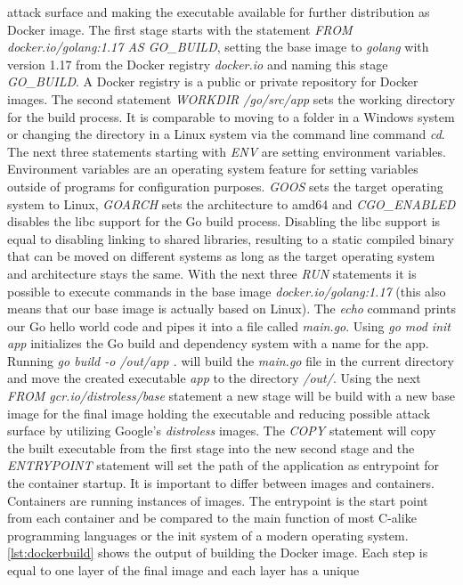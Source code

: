 \documentclass[titlepage]{report}
\begin{document}
attack surface and making the executable available for further distribution as Docker image. The first stage starts with the statement
\emph{FROM docker.io/golang:1.17 AS GO\_BUILD}, setting the base image to \emph{golang} with version 1.17 from the Docker registry \emph{docker.io}
and naming this stage \emph{GO\_BUILD}. A Docker registry is a public or private repository for Docker images. 
The second statement \emph{WORKDIR /go/src/app} sets the working directory for the build process. It is comparable to moving to a folder
in a Windows system or changing the directory in a Linux system via the command line command \emph{cd}. The next three statements starting
with \emph{ENV} are setting environment variables. Environment variables are an operating system feature for setting variables outside
of programs for configuration purposes. \emph{GOOS} sets the target operating system to Linux, \emph{GOARCH} sets the architecture to amd64
and \emph{CGO\_ENABLED} disables the libc support for the Go build process. Disabling the libc support is equal to disabling linking
to shared libraries, resulting to a static compiled binary that can be moved on different systems as long as the target operating system
and architecture stays the same. With the next three \emph{RUN} statements it is possible to execute commands in the base image
\emph{docker.io/golang:1.17} (this also means that our base image is actually based on Linux). The \emph{echo} command
prints our Go hello world code and pipes it into a file called \emph{main.go}. Using \emph{go mod init app} initializes
the Go build and dependency system with a name for the app. Running \emph{go build -o /out/app .} will build the \emph{main.go}
file in the current directory and move the created executable \emph{app} to the directory \emph{/out/}. Using the next
\emph{FROM gcr.io/distroless/base} statement a new stage will be build with a new base image for the final image holding the executable
and reducing possible attack surface by utilizing Google's \emph{distroless} images. The \emph{COPY} statement will
copy the built executable from the first stage into the new second stage and the \emph{ENTRYPOINT} statement will set
the path of the application as entrypoint for the container startup. It is important to differ between images and containers.
Containers are running instances of images. The entrypoint is the start point from each container and be compared to the main function
of most C-alike programming languages or the init system of a modern operating system. \autoref{lst:dockerbuild} shows
the output of building the Docker image. Each step is equal to one layer of the final image and each layer has a unique
\end{document}
